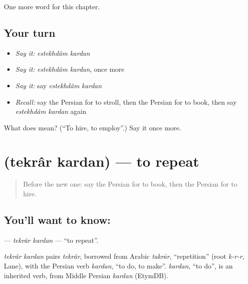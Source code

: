 \begin{grammarlens}[title={What you've built}]
One more word for this chapter.
\end{grammarlens}

\subsection*{Your turn}
\begin{itemize}
\raggedright
  \item \emph{Say it:} \emph{estekhdâm kardan}
  \item \emph{Say it:} \emph{estekhdâm kardan}, once more
  \item \emph{Say it:} say \emph{estekhdâm kardan}
  \item \emph{Recall:} say the Persian for to stroll, then the Persian for to book, then say \emph{estekhdâm kardan} again
\end{itemize}

\begin{tcolorbox}[breakable,colback=teal!4,colframe=teal!35!black,title={Before you move on}]
What does   mean? (\textquotedblleft{}To hire, to employ\textquotedblright{}.) Say it once more.
\end{tcolorbox}
\section[\texorpdfstring{\fa{تکرار} \fa{کردن} (tekrâr kardan)}{تکرار کردن (tekrâr kardan)}]{  (tekrâr kardan) — to repeat}

\label{lesson:FA-C182-tekrar-kardan}



\begin{quote}
Before the new one: say the Persian for to book, then the Persian for to hire.
\end{quote}

\subsection*{You'll want to know:  }
\textbf{ } — \emph{tekrâr kardan} — \textquotedblleft{}to repeat\textquotedblright{}.

\begin{cousinweb}
\emph{tekrâr kardan} pairs \emph{tekrâr}, borrowed from Arabic \emph{takrār}, \textquotedblleft{}repetition\textquotedblright{} (root \emph{k-r-r}, Lane), with the Persian verb \emph{kardan}, \textquotedblleft{}to do, to make\textquotedblright{}. \emph{kardan}, \textquotedblleft{}to do\textquotedblright{}, is an inherited verb, from Middle Persian \emph{kardan} (EtymDB).
\end{cousinweb}

